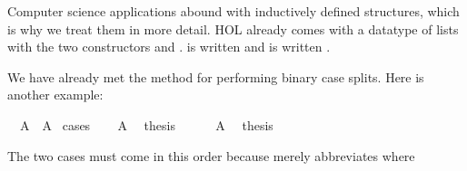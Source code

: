 %
\begin{isabellebody}%
\def\isabellecontext{Induction}%
%
\isadelimtheory
%
\endisadelimtheory
%
\isatagtheory
%
\endisatagtheory
{\isafoldtheory}%
%
\isadelimtheory
%
\endisadelimtheory
%
\isamarkuptrue%
%
\begin{isamarkuptext}%
Computer science applications abound with inductively defined
structures, which is why we treat them in more detail. HOL already
comes with a datatype of lists with the two constructors 
and .  is written  and  is written .%
\end{isamarkuptext}%
\isamarkuptrue%
%
\isamarkuptrue%
%
\begin{isamarkuptext}%
We have already met the  method for performing
binary case splits. Here is another example:%
\end{isamarkuptext}%
\isamarkuptrue%
\isamarkupfalse%
\ {}{}\ A\ {}\ A{}\isanewline
%
\isadelimproof
%
\endisadelimproof
%
\isatagproof
{}\isamarkupfalse%
\ cases\isanewline
\ \ \isamarkupfalse%
\ {}A{}\ \isamarkupfalse%
\ {}thesis\ \isamarkupfalse%
\isanewline
{}\isamarkupfalse%
\isanewline
\ \ \isamarkupfalse%
\ {}{}\ A{}\ \isamarkupfalse%
\ {}thesis\ \isamarkupfalse%
\isanewline
{}\isamarkupfalse%
%
\endisatagproof
{\isafoldproof}%
%
\isadelimproof
%
\endisadelimproof
%
\begin{isamarkuptext}%
\noindent The two cases must come in this order because  merely abbreviates  where

\end{isamarkuptext}
\end{isabellebody}
